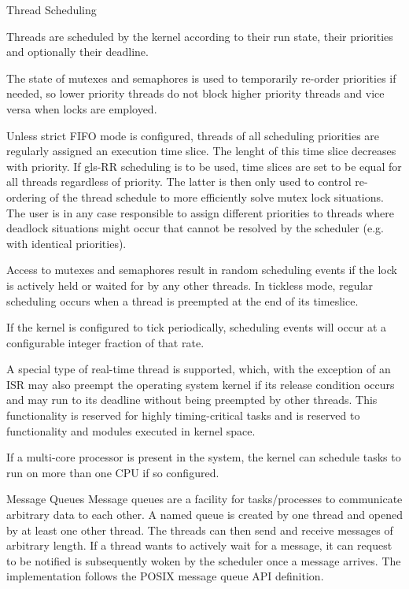 %
{Thread Scheduling}{%
Threads are scheduled by the kernel according to their run state, their
priorities and optionally their deadline.\newline

The state of mutexes and semaphores is used to temporarily re-order priorities if
needed, so lower priority threads do not block higher priority threads and vice
versa when locks are employed.\newline

Unless strict \gls{FIFO} mode is configured, threads of all scheduling
priorities are regularly assigned an execution time slice. The lenght of this
time slice decreases with priority. If \gls{gls-RR} scheduling is to be used,
time slices are set to be equal for all threads regardless of priority.
The latter is then only used to control re-ordering of the thread schedule to
more efficiently solve mutex lock situations. The user is in any case
responsible to assign different priorities to threads where deadlock situations
might occur that cannot be resolved by the scheduler (e.g. with identical
priorities).\newline

Access to mutexes and semaphores result in random scheduling events if the lock
is actively held or waited for by any other threads.
In tickless mode, regular scheduling occurs when a thread is preempted at the
end of its timeslice.\newline

If the kernel is configured to tick periodically, scheduling events will occur
at a configurable integer fraction of that rate.\newline

A special type of real-time thread is supported, which, with the exception of
an \gls{ISR} may also preempt the operating system kernel if its release
condition occurs and may run to its deadline without being preempted by other
threads. This functionality is reserved for highly timing-critical tasks and 
is reserved to functionality and modules executed in kernel space.\newline


If a multi-core processor is present in the system, the kernel can schedule
tasks to run on more than one \gls{CPU} if so configured.

}%
{}{}


%
{Message Queues}{%
Message queues are a facility for tasks/processes to communicate arbitrary 
data to each other. A named queue is created by one thread and opened by at
least one other thread. The threads can then send and receive messages
of arbitrary length. If a thread wants to actively wait for a message, it can
request to be notified is subsequently woken by the scheduler once a message
arrives.
}%
{}{The implementation follows the \gls{POSIX} message
queue \gls{API} definition.}


